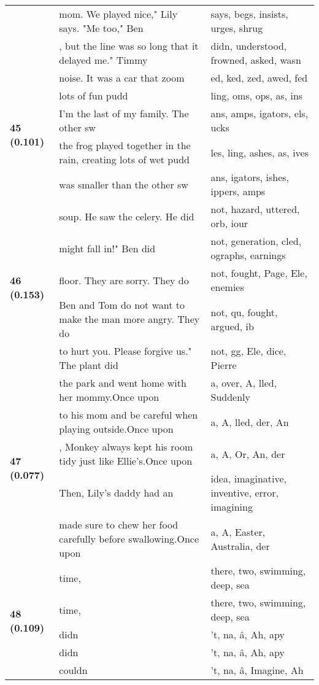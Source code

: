 \documentclass{article}
\begin{document}
\begin{adjustbox}{max width=\textwidth}
\begin{tabular}{p{} p{} p{}}
 & mom. We played nice," Lily says.  "Me too," Ben & says,  begs,  insists,  urges,  shrug \\
 & , but the line was so long that it delayed me." Timmy & didn,  understood,  frowned,  asked,  wasn \\
\midrule
\multirow{5}{*}{\textbf{45 (0.101)}} & noise. It was a car that zoom & ed, ked, zed, awed, fed \\
 & lots of fun pudd & ling, oms, ops, as, ins \\
 & I'm the last of my family. The other sw & ans, amps, igators, els, ucks \\
 & the frog played together in the rain, creating lots of wet pudd & les, ling, ashes, as, ives \\
 & was smaller than the other sw & ans, igators, ishes, ippers, amps \\
\midrule
\multirow{5}{*}{\textbf{46 (0.153)}} & soup. He saw the celery. He did & not,  hazard, uttered,  orb, iour \\
 & might fall in!"  Ben did & not,  generation, cled, ographs,  earnings \\
 & floor. They are sorry. They do & not,  fought, Page, Ele,  enemies \\
 & Ben and Tom do not want to make the man more angry. They do & not,  qu,  fought,  argued, ib \\
 & to hurt you. Please forgive us."  The plant did & not, gg, Ele,  dice, Pierre \\
\midrule
\multirow{5}{*}{\textbf{47 (0.077)}} & the park and went home with her mommy.Once upon & a,  over, A, lled, Suddenly \\
 & to his mom and be careful when playing outside.Once upon & a, A, lled, der, An \\
 & , Monkey always kept his room tidy just like Ellie's.Once upon & a, A, Or, An, der \\
 & Then, Lily's daddy had an & idea,  imaginative,  inventive,  error,  imagining \\
 & made sure to chew her food carefully before swallowing.Once upon & a, A,  Easter,  Australia, der \\
\midrule
\multirow{5}{*}{\textbf{48 (0.109)}} & time, & there,  two,  swimming,  deep,  sea \\
 & time, & there,  two,  swimming,  deep,  sea \\
 & didn & 't, na, â, Ah, apy \\
 & didn & 't, na, â, Ah, apy \\
 & couldn & 't, na, â, Imagine, Ah \\

\end{tabular}
\end{adjustbox}
\end{document}
